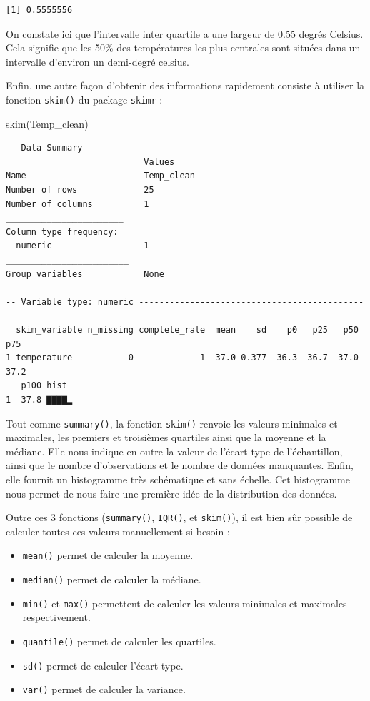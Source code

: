 \documentclass[
  a4paper,
]{article}
\newenvironment{Shaded}{\begin{snugshade}}{\end{snugshade}}
\newcommand{\FunctionTok}[1]{\textcolor[rgb]{0.39,0.29,0.61}{#1}}
\newcommand{\NormalTok}[1]{\textcolor[rgb]{0.12,0.11,0.11}{#1}}
\providecommand{\tightlist}{%
  \setlength{\itemsep}{0pt}\setlength{\parskip}{0pt}}
\begin{document}
\begin{verbatim}
[1] 0.5555556
\end{verbatim}

On constate ici que l'intervalle inter quartile a une largeur de 0.55 degrés Celsius. Cela signifie que les 50\% des températures les plus centrales sont situées dans un intervalle d'environ un demi-degré celsius.

Enfin, une autre façon d'obtenir des informations rapidement consiste à utiliser la fonction \texttt{skim()} du package \texttt{skimr} :

\begin{Shaded}
\begin{Highlighting}[]
\FunctionTok{skim}\NormalTok{(Temp\_clean)}
\end{Highlighting}
\end{Shaded}

\begin{verbatim}
-- Data Summary ------------------------
                           Values    
Name                       Temp_clean
Number of rows             25        
Number of columns          1         
_______________________              
Column type frequency:               
  numeric                  1         
________________________             
Group variables            None      

-- Variable type: numeric ------------------------------------------------------
  skim_variable n_missing complete_rate  mean    sd    p0   p25   p50   p75
1 temperature           0             1  37.0 0.377  36.3  36.7  37.0  37.2
   p100 hist 
1  37.8 ▇▇▇▇▂
\end{verbatim}

Tout comme \texttt{summary()}, la fonction \texttt{skim()} renvoie les valeurs minimales et maximales, les premiers et troisièmes quartiles ainsi que la moyenne et la médiane. Elle nous indique en outre la valeur de l'écart-type de l'échantillon, ainsi que le nombre d'observations et le nombre de données manquantes. Enfin, elle fournit un histogramme très schématique et sans échelle. Cet histogramme nous permet de nous faire une première idée de la distribution des données.

Outre ces 3 fonctions (\texttt{summary()}, \texttt{IQR()}, et \texttt{skim()}), il est bien sûr possible de calculer toutes ces valeurs manuellement si besoin :

\begin{itemize}
\tightlist
\item
  \texttt{mean()} permet de calculer la moyenne.
\item
  \texttt{median()} permet de calculer la médiane.
\item
  \texttt{min()} et \texttt{max()} permettent de calculer les valeurs minimales et maximales respectivement.
\item
  \texttt{quantile()} permet de calculer les quartiles.
\item
  \texttt{sd()} permet de calculer l'écart-type.
\item
  \texttt{var()} permet de calculer la variance.
\end{itemize}
\end{document}
